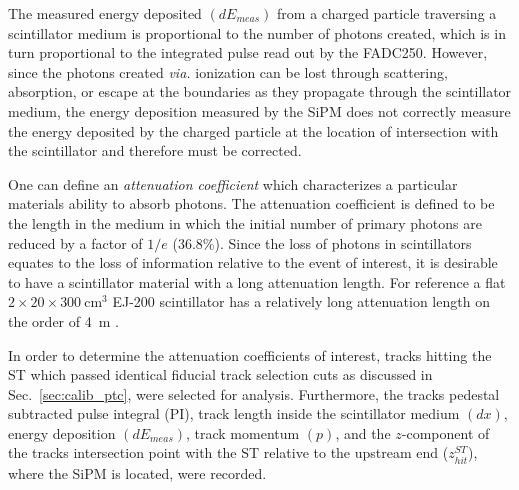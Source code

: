 
The measured energy deposited $(dE_{meas})$ from a charged particle traversing a scintillator medium is proportional to the number of photons created, which is in turn proportional to the integrated pulse read out by the FADC250. However, since the photons created \textit{via.} ionization can be lost through scattering, absorption, or escape at the boundaries as they propagate through the scintillator medium, the energy deposition measured by the SiPM does not correctly measure the energy deposited by the charged particle at the location of intersection with the scintillator and therefore must be corrected.


One can define an \textit{attenuation coefficient} which characterizes a particular materials ability to absorb photons. The attenuation coefficient is defined to be the length in the medium in which the initial number of primary photons are reduced by a factor of $1/e$ (36.8\%).  Since the loss of photons in scintillators equates to the loss of information relative to the event of interest, it is desirable to have a scintillator material with a long attenuation length.  For reference a flat $2 \times 20 \times 300\ \mathrm{cm^{3}}$ EJ-200 scintillator has a relatively long attenuation length on the order of 4~m \cite{ej200_specs}.

In order to determine the attenuation coefficients of interest, tracks hitting the ST which passed identical fiducial track selection cuts as discussed in Sec.~\ref{sec:calib_ptc}, were selected for analysis.  Furthermore, the tracks pedestal subtracted pulse integral (PI), track length inside the scintillator medium $(dx)$, energy deposition $(dE_{meas})$, track momentum $(p)$, and the $z$-component of the tracks intersection point with the ST relative to the upstream end ($z^{ST}_{hit}$), where the SiPM is located, were recorded.  

